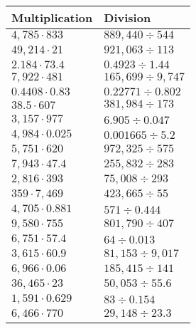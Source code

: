 \begin{longtable}[]{@{}ll@{}}
\toprule
Multiplication & Division\tabularnewline
\midrule
\endhead
\(4,785\cdot833\) & \(889,440÷544\)\tabularnewline
\(49,214\cdot21\) & \(921,063÷113\)\tabularnewline
\(2.184\cdot73.4\) & \(0.4923÷1.44\)\tabularnewline
\(7,922\cdot481\) & \(165,699÷9,747\)\tabularnewline
\(0.4408\cdot0.83\) & \(0.22771÷0.802\)\tabularnewline
\(38.5\cdot607\) & \(381,984÷173\)\tabularnewline
\(3,157\cdot977\) & \(6.905÷0.047\)\tabularnewline
\(4,984\cdot0.025\) & \(0.001665÷5.2\)\tabularnewline
\(5,751\cdot620\) & \(972,325÷575\)\tabularnewline
\(7,943\cdot47.4\) & \(255,832÷283\)\tabularnewline
\(2,816\cdot393\) & \(75,008÷293\)\tabularnewline
\(359\cdot7,469\) & \(423,665÷55\)\tabularnewline
\(4,705\cdot0.881\) & \(571÷0.444\)\tabularnewline
\(9,580\cdot755\) & \(801,790÷407\)\tabularnewline
\(6,751\cdot57.4\) & \(64÷0.013\)\tabularnewline
\(3,615\cdot60.9\) & \(81,153÷9,017\)\tabularnewline
\(6,966\cdot0.06\) & \(185,415÷141\)\tabularnewline
\(36,465\cdot23\) & \(50,053÷55.6\)\tabularnewline
\(1,591\cdot0.629\) & \(83÷0.154\)\tabularnewline
\(6,466\cdot770\) & \(29,148÷23.3\)\tabularnewline
\bottomrule
\end{longtable}
